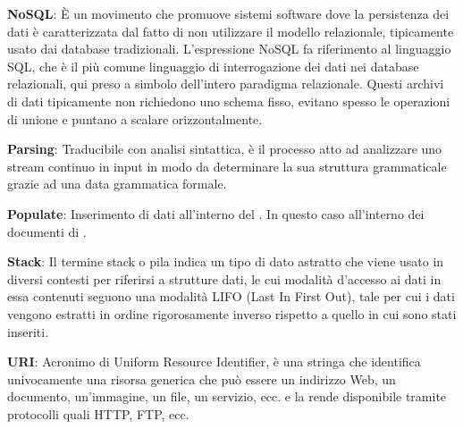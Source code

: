 \textbf{NoSQL}: È un movimento che promuove sistemi software dove la persistenza dei dati è caratterizzata dal fatto di non utilizzare il modello relazionale, tipicamente usato dai database tradizionali. L'espressione NoSQL fa riferimento al linguaggio SQL, che è il più comune linguaggio di interrogazione dei dati nei database relazionali, qui preso a simbolo dell'intero paradigma relazionale. Questi archivi di dati tipicamente non richiedono uno schema fisso, evitano spesso le operazioni di unione e puntano a scalare orizzontalmente.


\textbf{Parsing}: Traducibile con analisi sintattica, è il processo atto ad analizzare uno stream continuo in input in modo da determinare la sua struttura grammaticale grazie ad una data grammatica formale.

\textbf{Populate}:
Inserimento di dati all'interno del . In questo caso all'interno dei documenti di .


\textbf{Stack}: 
Il termine stack o pila indica un tipo di dato astratto che viene usato in diversi contesti per riferirsi a strutture dati, le cui modalità d'accesso ai dati in essa contenuti seguono una modalità LIFO (Last In First Out), tale per cui i dati vengono estratti in ordine rigorosamente inverso rispetto a quello in cui sono stati inseriti.


\textbf{URI}: Acronimo di Uniform Resource Identifier, è una stringa che identifica univocamente una risorsa generica che può essere un indirizzo Web, un documento, un'immagine, un file, un servizio, ecc. e la rende disponibile tramite protocolli quali HTTP, FTP, ecc.